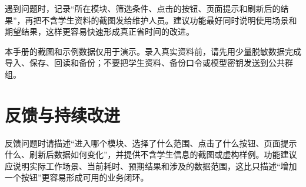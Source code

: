 \documentclass[UTF8,zihao=-4,oneside]{ctexrep}
\begin{document}
遇到问题时，记录“所在模块、筛选条件、点击的按钮、页面提示和刷新后的结果”，再把不含学生资料的截图发给维护人员。建议功能最好同时说明使用场景和期望结果，这样更容易快速形成真正省时间的改进。

\begin{warningbox}
本手册的截图和示例数据仅用于演示。录入真实资料前，请先用少量脱敏数据完成导入、保存、回读和备份；不要把学生资料、备份口令或模型密钥发送到公共群组。
\end{warningbox}

\enlargethispage{4\baselineskip}
\section{反馈与持续改进}

反馈问题时请描述“进入哪个模块、选择了什么范围、点击了什么按钮、页面提示什么、刷新后数据如何变化”，并提供不含学生信息的截图或虚构样例。功能建议应说明实际工作场景、当前耗时、预期结果和涉及的数据范围，这比只描述“增加一个按钮”更容易形成可用的业务闭环。
\end{document}
